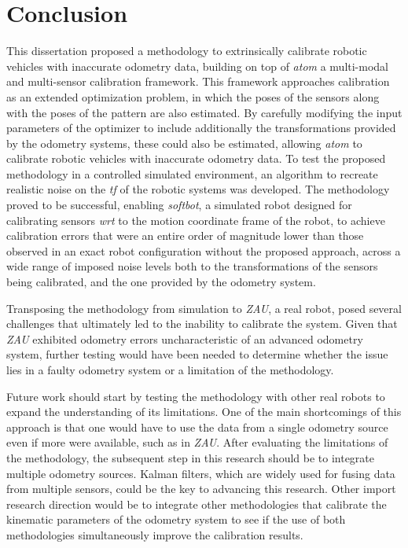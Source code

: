\documentclass{ieeeaccess}
\begin{document}
\section{Conclusion}

This dissertation proposed a methodology to extrinsically calibrate robotic vehicles with inaccurate odometry data, building on top of
\textit{atom} a multi-modal and multi-sensor calibration framework. This framework approaches calibration as an
extended optimization problem, in which the poses of the sensors along with the poses of the pattern are also
estimated. By carefully modifying the input parameters of the optimizer to include additionally the
transformations provided by the odometry systems, these could also be estimated, allowing \textit{atom} to
calibrate robotic vehicles with inaccurate odometry data. To test the proposed methodology in a controlled simulated environment,
an algorithm to recreate realistic noise on the \textit{tf} of the robotic systems was developed. The methodology
proved to be successful, enabling \textit{softbot}, a simulated robot designed for calibrating sensors \textit{wrt}
to the motion coordinate frame of the robot, to achieve calibration errors that were an entire order of
magnitude lower than those observed in an exact robot configuration without the proposed approach, across a
wide range of imposed noise levels both to the transformations of the sensors being calibrated, and the one
provided by the odometry system. 

Transposing the methodology from simulation to \textit{ZAU}, a real robot, posed several challenges that
ultimately led to the inability to calibrate the system. Given that \textit{ZAU} exhibited odometry errors
uncharacteristic of an advanced odometry system, further testing would have been needed to determine whether the issue
lies in a faulty odometry system or a limitation of the methodology.

Future work should start by testing the methodology with other real robots to expand the understanding of
its limitations. One of the main shortcomings of this approach is that one would have to use
the data from a single odometry source even if more were available, such as in \textit{ZAU}. After evaluating
the limitations of the methodology, the subsequent step in this research should be to integrate multiple odometry
sources. Kalman filters, which are widely used for fusing data from multiple sensors, could be the key to
advancing this research. Other import research direction would be to integrate other methodologies that
calibrate the kinematic parameters of the odometry system to see if the use of both methodologies
simultaneously improve the calibration results.

\EOD
\end{document}
